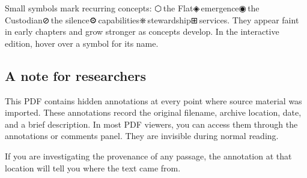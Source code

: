 \vspace{0.5cm}

Small symbols mark recurring concepts: \textcolor[HTML]{b8860b}{⬡}\,the Flat\enspace \textcolor[HTML]{5b9bd5}{◈}\,emergence\enspace \textcolor[HTML]{c4a97d}{◉}\,the Custodian\enspace \textcolor[HTML]{888888}{⊘}\,the silence\enspace \textcolor[HTML]{a0a0a0}{⚙}\,capabilities\enspace \textcolor[HTML]{a0a0a0}{⎈}\,stewardship\enspace \textcolor[HTML]{a0a0a0}{⊞}\,services. They appear faint in early chapters and grow stronger as concepts develop. In the interactive edition, hover over a symbol for its name.

\vspace{1cm}

\subsection*{A note for researchers}
\label{front:a-note-for-researchers}

This PDF contains hidden annotations at every point where source material was imported. These annotations record the original filename, archive location, date, and a brief description. In most PDF viewers, you can access them through the annotations or comments panel. They are invisible during normal reading.

If you are investigating the provenance of any passage, the annotation at that location will tell you where the text came from.
